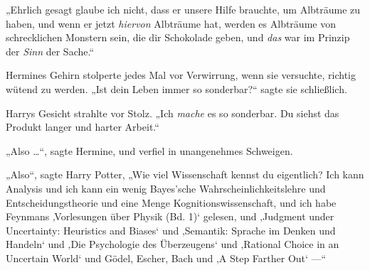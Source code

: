 „Ehrlich gesagt glaube ich nicht, dass er unsere Hilfe brauchte, um Albträume zu haben, und wenn er jetzt \emph{hiervon} Albträume hat, werden es Albträume von schrecklichen Monstern sein, die dir Schokolade geben, und \emph{das} war im Prinzip der \emph{Sinn} der Sache.“

Hermines Gehirn stolperte jedes Mal vor Verwirrung, wenn sie versuchte, richtig wütend zu werden.
„Ist dein Leben immer so sonderbar?“ sagte sie schließlich.

Harrys Gesicht strahlte vor Stolz.
„Ich \emph{mache} es so sonderbar. Du siehst das Produkt langer und harter Arbeit.“

„Also …“, sagte Hermine, und verfiel in unangenehmes Schweigen.

„Also“, sagte Harry Potter,
„Wie viel Wissenschaft kennst du eigentlich? Ich kann Analysis und ich kann ein wenig Bayes’sche Wahrscheinlichkeitslehre und Entscheidungstheorie und eine Menge Kognitionswissenschaft, und ich habe Feynmans ‚Vorlesungen über Physik (Bd. 1)‘ gelesen, und ‚Judgment under Uncertainty: Heuristics and Biases‘ und ‚Semantik: Sprache im Denken und Handeln‘ und ‚Die Psychologie des Überzeugens‘ und ‚Rational Choice in an Uncertain World‘ und Gödel, Escher, Bach und ‚A Step Farther Out‘ —“ %

